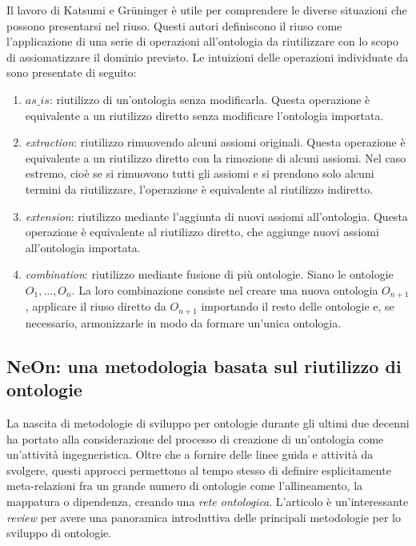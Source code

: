 \noindent Il lavoro di Katsumi e Gr\"{u}ninger \cite{katsumi2018ontology} è utile per comprendere le diverse situazioni che possono presentarsi nel riuso. Questi autori definiscono il riuso come l'applicazione di una serie di operazioni all'ontologia da riutilizzare con lo scopo di assiomatizzare il dominio previsto. Le intuizioni delle operazioni individuate da \cite{katsumi2018ontology} sono presentate di seguito:
\begin{enumerate}
	\item $as\_is$: riutilizzo di un'ontologia senza modificarla. Questa operazione è equivalente a un riutilizzo diretto senza modificare l'ontologia importata.
	
	\item \textit{extraction}: riutilizzo rimuovendo alcuni assiomi originali. Questa operazione è equivalente a un riutilizzo diretto con la rimozione di alcuni assiomi. Nel caso estremo, cioè se si rimuovono tutti gli assiomi e si prendono solo alcuni termini da riutilizzare, l'operazione è equivalente al riutilizzo indiretto.
	
	\item \textit{extension}: riutilizzo mediante l'aggiunta di nuovi assiomi all'ontologia. Questa operazione è equivalente al riutilizzo diretto, che aggiunge nuovi assiomi all'ontologia importata.
	
	\item \textit{combination}: riutilizzo mediante fusione di più ontologie. Siano le ontologie $O_1, \dots, O_n$. La loro combinazione consiste nel creare una nuova ontologia $O_{n+1}$, applicare il riuso diretto da $O_{n+1}$ importando il resto delle ontologie e, se necessario, armonizzarle in modo da formare un'unica ontologia.
\end{enumerate}
\subsection{NeOn: una metodologia basata sul riutilizzo di ontologie}
La nascita di metodologie di sviluppo per ontologie durante gli ultimi due decenni ha portato alla considerazione del processo di creazione di un'ontologia come un'attività ingegneristica. Oltre che a fornire delle linee guida e attività da svolgere, questi approcci permettono al tempo stesso di definire esplicitamente meta-relazioni fra un grande numero di ontologie come l’allineamento, la mappatura o dipendenza, creando una \textit{rete ontologica}. L'articolo \cite{iqbal2013analysis} è un'interessante \textit{review} per avere una panoramica introduttiva delle principali metodologie per lo sviluppo di ontologie.

